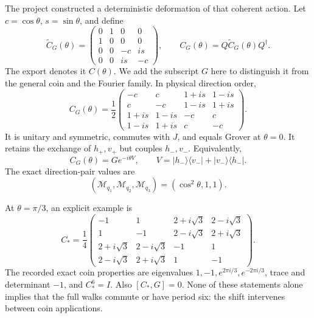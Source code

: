 \documentclass[11pt,a4paper,oneside]{report}
\newcommand{\ket}[1]{\lvert #1\rangle}
\newcommand{\bra}[1]{\langle #1\rvert}
\newcommand{\Id}{I}
\numberwithin{equation}{chapter}
\begin{document}
The project constructed a deterministic deformation of that coherent
action. Let \(c=\cos\theta\), \(s=\sin\theta\), and define
\begin{equation}
\boxed{
\widetilde C_G(\theta)=
\begin{pmatrix}
0&1&0&0\\1&0&0&0\\0&0&-c&is\\0&0&is&-c
\end{pmatrix},\qquad
C_G(\theta)=Q\widetilde C_G(\theta)Q^\dagger.
}
\end{equation}
The export denotes it \(C(\theta)\). We add the subscript \(G\)
here to distinguish it from the general coin and the Fourier family.
In physical direction order,
\begin{equation}
C_G(\theta)=\frac12
\begin{pmatrix}
-c&c&1+is&1-is\\
c&-c&1-is&1+is\\
1+is&1-is&-c&c\\
1-is&1+is&c&-c
\end{pmatrix}.
\end{equation}
It is unitary and symmetric, commutes with \(J\), and equals Grover
at \(\theta=0\). It retains the exchange of \(h_+,v_+\) but couples
\(h_-,v_-\). Equivalently,
\begin{equation}
C_G(\theta)=G e^{-i\theta V},\qquad
V=\ket{h_-}\bra{v_-}+\ket{v_-}\bra{h_-}.
\end{equation}
The exact direction-pair values are
\begin{equation}
(\mathcal M_{q_1},\mathcal M_{q_2},\mathcal M_{q_3})
=(\cos^2\theta,1,1).
\end{equation}

At \(\theta=\pi/3\), an explicit example is
\begin{equation}
\boxed{
C_* =\frac14\begin{pmatrix}
-1&1&2+i\sqrt3&2-i\sqrt3\\
1&-1&2-i\sqrt3&2+i\sqrt3\\
2+i\sqrt3&2-i\sqrt3&-1&1\\
2-i\sqrt3&2+i\sqrt3&1&-1
\end{pmatrix}.
}
\end{equation}
The recorded exact coin properties are eigenvalues
\(1,-1,e^{2\pi i/3},e^{-2\pi i/3}\), trace and determinant \(-1\),
and \(C_*^6=\Id\). Also \([C_*,G]=0\). None of these statements
alone implies that the full walks commute or have period six: the
shift intervenes between coin applications.
\end{document}
